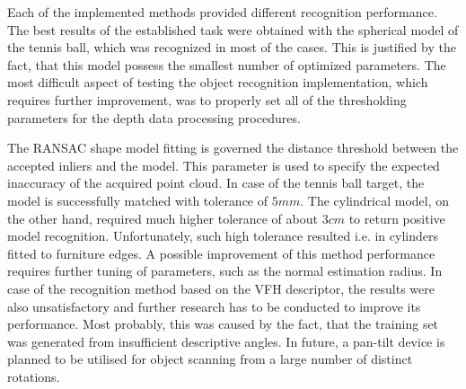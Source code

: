 Each of the implemented methods provided different recognition performance. The best results of the established task were obtained with the spherical model of the tennis ball, which was recognized in most of the cases. This is justified by the fact, that this model possess the smallest number of optimized parameters. The most difficult aspect of testing the object recognition implementation, which requires further improvement, was to properly set all of the thresholding parameters for the depth data processing procedures. 

The RANSAC shape model fitting is governed the distance threshold between the accepted inliers and the model. This parameter is used to specify the expected inaccuracy of the acquired point cloud.  In case of the tennis ball target, the model is successfully matched with tolerance of $5mm$. The cylindrical model, on the other hand, required much higher tolerance of about $3cm$ to return positive model recognition. Unfortunately, such high tolerance resulted i.e. in cylinders fitted to furniture edges. A possible improvement of this method performance requires further tuning of parameters, such as the normal estimation radius. In case of the recognition method based on the VFH descriptor, the results were also unsatisfactory and further research has to be conducted to improve its performance. Most probably, this was caused by the fact, that the training set was generated from insufficient descriptive angles. In future, a pan-tilt device is planned to be utilised for object scanning from a large number of distinct rotations.